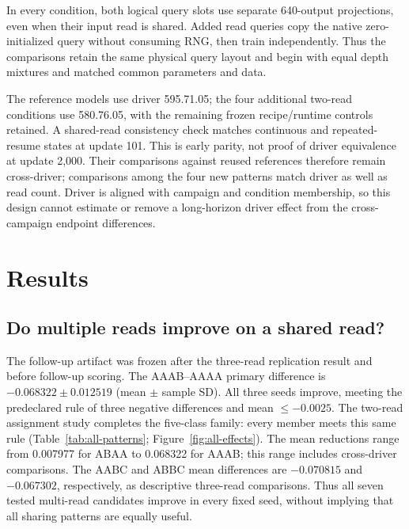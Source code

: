 \documentclass[11pt,letterpaper]{article}
\newcommand{\route}[1]{\textsf{#1}}
\newcommand{\StageAPrimaryMean}{-0.068322}
\newcommand{\StageAPrimarySD}{0.012519}
\newcommand{\StageAAABCMean}{-0.070815}
\newcommand{\StageAABBCMean}{-0.067302}
\newcommand{\TwoReadWeakGain}{0.007977}
\newcommand{\TwoReadStrongGain}{0.068322}
\begin{document}
In every condition, both logical query slots use separate 640-output
projections, even when their input read is shared. Added read queries copy
the native zero-initialized query without consuming RNG, then train
independently. Thus the comparisons retain the same physical query layout
and begin with equal depth mixtures and matched common parameters and data.

The reference models use driver 595.71.05; the four additional two-read
conditions use 580.76.05, with the remaining frozen recipe/runtime controls retained.
A shared-read consistency check matches continuous and repeated-resume
states at update 101. This is early parity, not proof of driver
equivalence at update 2,000. Their comparisons against reused references
therefore remain cross-driver; comparisons among the four new patterns
match driver as well as read count. Driver is aligned with campaign and condition
membership, so this design cannot estimate or remove a long-horizon driver
effect from the cross-campaign endpoint differences.

\section{Results}
\subsection{Do multiple reads improve on a shared read?}
\label{sec:stage-a}
The follow-up artifact was frozen after the three-read replication result and before
follow-up scoring. The \route{AAAB}--\route{AAAA} primary difference is
$\StageAPrimaryMean\pm\StageAPrimarySD$ (mean $\pm$ sample SD).
All three seeds improve, meeting the predeclared rule of three negative
differences and mean $\leq-0.0025$.
The two-read assignment study completes the five-class family: every member
meets this same rule (Table~\ref{tab:all-patterns}; Figure~\ref{fig:all-effects}).
The mean reductions range from \TwoReadWeakGain{} for \route{ABAA} to
\TwoReadStrongGain{} for \route{AAAB}; this range includes cross-driver comparisons.
The \route{AABC} and \route{ABBC} mean differences are
$\StageAAABCMean$ and $\StageAABBCMean$, respectively, as descriptive
three-read comparisons. Thus all seven tested multi-read candidates improve
in every fixed seed, without implying that all sharing patterns are equally useful.

\begin{table}[!ht]
\centering\small\setlength{\tabcolsep}{4pt}

\caption{Common follow-up evaluation at 2,000 updates, three seeds per pattern.
$\Delta$ is candidate minus \route{AAAA}; SD is the sample SD of paired seed
differences, not a confidence interval. PPL reduction is
$100(1-\exp(\overline\Delta))$. Pass denotes the frozen two-read rule;
three-read rows remain descriptive. Bold marks the lowest observed mean
loss. $^{*}$marks a driver mismatch with the \route{AAAA} reference
(Section~\ref{sec:design}); an update-101 bridge does not establish
endpoint equivalence. References are reused, not retrained for the two-read
assignment study.}
\label{tab:all-patterns}
\end{table}
\end{document}
